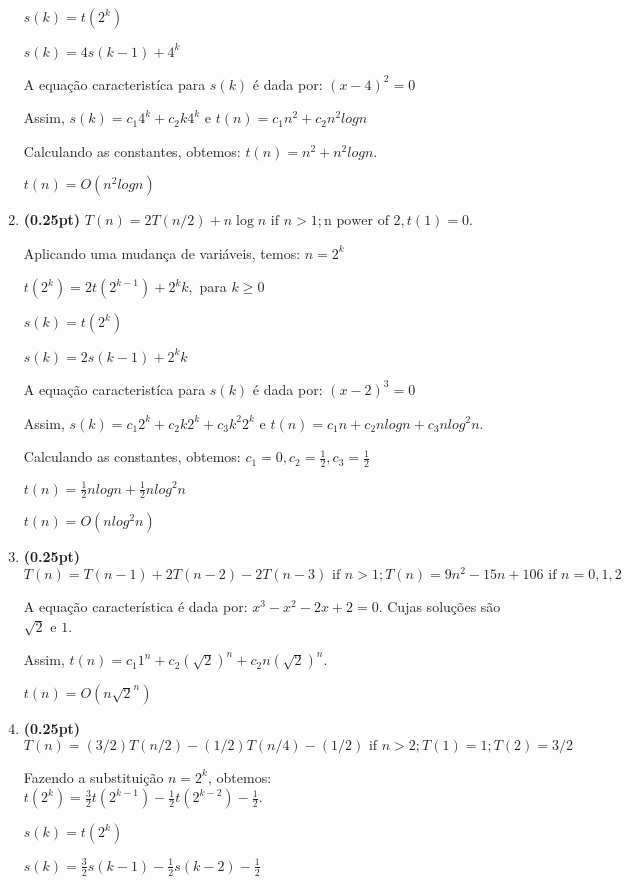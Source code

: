 \documentclass{article}
\begin{document}
\begin{enumerate}[label=\Alph*]
   $s(k) = t(2^{k})$
   
   $s(k) = 4s(k - 1) + 4^{k}$
   
   A equação caracteristíca para $s(k)$ é dada por:  $(x - 4)^{2} = 0$
   
   Assim, $s(k) = c_{1}4^{k} + c_{2}k4^{k}$ e $t(n) = c_{1}n^{2} + c_{2}n^{2}log n$
 
 Calculando as constantes, obtemos: $t(n) = n^{2} + n^{2}log n$.
 
 $t(n) = O(n^{2}logn)$
 
  \item \textbf{(0.25pt)} $T(n) = 2T(n/2) + n\log n \mbox{ if } n>1; \mbox{n power of 2}, t(1) = 0.$
  
  Aplicando uma mudança de variáveis, temos: $ n = 2^{k}$
   
   $t(2^{k}) = 2t(2^{k - 1}) + 2^{k}k,$ para $ k \geq 0$
   
   $s(k) = t(2^{k})$
   
   $s(k) = 2s(k - 1) + 2^{k}k$
   
   A equação caracteristíca para $s(k)$ é dada por:  $(x - 2)^{3} = 0$
   
   Assim, $s(k) = c_{1}2^{k} + c_{2}k2^{k} + c_{3}k^{2}2^{k}$ e $t(n) = c_{1}n + c_{2}nlog n + c_{3}n log^{2}n$.
   
 Calculando as constantes, obtemos: $c_{1} = 0, c_{2} = \frac{1}{2}, c_{3} = \frac{1}{2}$
 
 $t(n) = \frac{1}{2}nlogn + \frac{1}{2}nlog^{2}n$
 
 $t(n) = O(nlog^{2}n)$
 
  \item \textbf{(0.25pt)} $T(n) = T(n-1) + 2T(n-2)-2T(n-3) \mbox{ if } n>1; T(n)=9n^2-15n+106 \mbox{ if } n=0,1,2$
  
  A equação característica é dada por: 
  $x^{3} - x^{2} - 2x + 2 = 0$. Cujas soluções são $\sqrt2 $ e $1$. 
  
  Assim, $t(n) = c_{1}1^{n} + c_{2}(\sqrt2)^{n} + c_{2}n(\sqrt2)^{n}$. 
  
  $t(n) = O(n\sqrt{2}^{n})$
 
  \item \textbf{(0.25pt)} $T(n)= (3/2)T(n/2) - (1/2)T(n/4)- (1/2) \mbox{ if } n>2; T(1)=1; T(2)=3/2$
  
  Fazendo a substituição $n = 2^{k}$, obtemos:
  $t(2^{k}) = \frac{3}{2}t(2^{k - 1}) - \frac{1}{2}t(2^{k -2}) - \frac{1}{2}$.
  
  $s(k) = t(2^{k})$
  
  $s(k) =  \frac{3}{2}s(k - 1) - \frac{1}{2}s(k -2) - \frac{1}{2} $
  

\end{enumerate}
\end{document}
